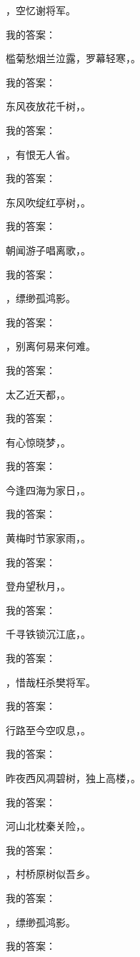 \documentclass[12pt, a4paper, addpoints]{exam}
\begin{document}
\begin{questions}
\question[4] \uline{\qquad\qquad\qquad}，空忆谢将军。

我的答案：

\question[4] 槛菊愁烟兰泣露，罗幕轻寒，\uline{\qquad\qquad\qquad}。

我的答案：

\question[4] 东风夜放花千树，\uline{\qquad\qquad\qquad}。

我的答案：

\question[4] \uline{\qquad\qquad\qquad}，有恨无人省。

我的答案：

\question[4] 东风吹绽红亭树，\uline{\qquad\qquad\qquad}。

我的答案：

\question[4] 朝闻游子唱离歌，\uline{\qquad\qquad\qquad}。

我的答案：

\question[4] \uline{\qquad\qquad\qquad}，缥缈孤鸿影。

我的答案：

\question[4] \uline{\qquad\qquad\qquad}，别离何易来何难。

我的答案：

\question[4] 太乙近天都，\uline{\qquad\qquad\qquad}。

我的答案：

\question[4] 有心惊晓梦，\uline{\qquad\qquad\qquad}。

我的答案：

\question[4] 今逢四海为家日，\uline{\qquad\qquad\qquad}。

我的答案：

\question[4] 黄梅时节家家雨，\uline{\qquad\qquad\qquad}。

我的答案：

\question[4] 登舟望秋月，\uline{\qquad\qquad\qquad}。

我的答案：

\question[4] 千寻铁锁沉江底，\uline{\qquad\qquad\qquad}。

我的答案：

\question[4] \uline{\qquad\qquad\qquad}，惜哉枉杀樊将军。

我的答案：

\question[4] 行路至今空叹息，\uline{\qquad\qquad\qquad}。

我的答案：

\question[4] 昨夜西风凋碧树，独上高楼，\uline{\qquad\qquad\qquad}。

我的答案：

\question[4] 河山北枕秦关险，\uline{\qquad\qquad\qquad}。

我的答案：

\question[4] \uline{\qquad\qquad\qquad}，村桥原树似吾乡。

我的答案：

\question[4] \uline{\qquad\qquad\qquad}，缥缈孤鸿影。

我的答案：

\end{questions}
\end{document}
